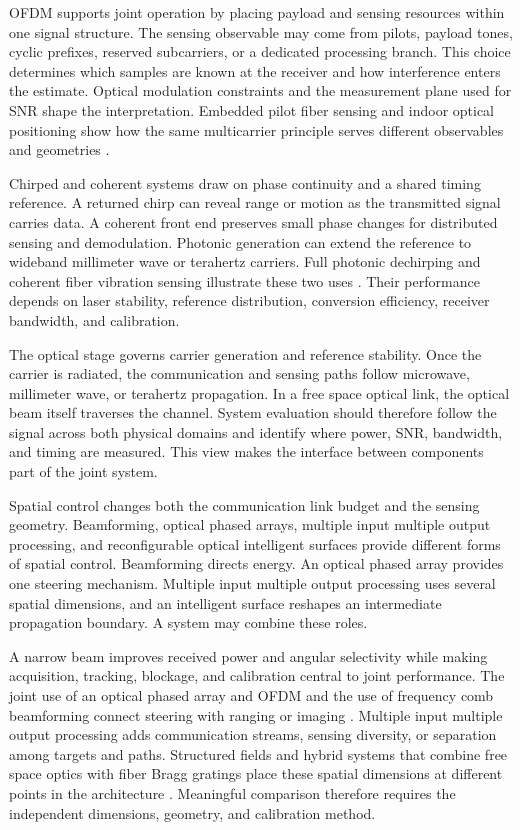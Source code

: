 OFDM supports joint operation by placing payload and sensing resources within
one signal structure. The sensing observable may come from pilots, payload
tones, cyclic prefixes, reserved subcarriers, or a dedicated processing branch.
This choice determines which samples are known at the receiver and how
interference enters the estimate. Optical modulation constraints and the
measurement plane used for SNR shape the interpretation. Embedded pilot fiber
sensing and indoor optical positioning show how the same multicarrier principle
serves different observables and geometries
\cite{OISAC_SCR00007,OISAC_SCR01024}.

Chirped and coherent systems draw on phase continuity and a shared timing
reference. A returned chirp can reveal range or motion as the transmitted signal
carries data. A coherent front end preserves small phase changes for distributed
sensing and demodulation. Photonic generation can extend the reference to
wideband millimeter wave or terahertz carriers. Full photonic dechirping and
coherent fiber vibration sensing illustrate these two uses
\cite{OISAC_SCR01000,OISAC_SCR00647}. Their performance depends on laser
stability, reference distribution, conversion efficiency, receiver bandwidth,
and calibration.

The optical stage governs carrier generation and reference stability. Once the
carrier is radiated, the communication and sensing paths follow microwave,
millimeter wave, or terahertz propagation. In a free space optical link, the
optical beam itself traverses the channel. System evaluation should therefore
follow the signal across both physical domains and identify where power, SNR,
bandwidth, and timing are measured. This view makes the interface between
components part of the joint system.

Spatial control changes both the communication link budget and the sensing
geometry. Beamforming, optical phased arrays, multiple input multiple output
processing, and reconfigurable optical intelligent surfaces provide different
forms of spatial control. Beamforming directs energy. An optical phased array
provides one steering mechanism. Multiple input multiple output processing uses
several spatial dimensions, and an intelligent surface reshapes an intermediate
propagation boundary. A system may combine these roles.

A narrow beam improves received power and angular selectivity while making
acquisition, tracking, blockage, and calibration central to joint performance.
The joint use of an optical phased array and OFDM and the use of frequency comb
beamforming connect steering with ranging or imaging
\cite{OISAC_SCR00941,OISAC_SCR00362}. Multiple input multiple output processing
adds communication streams, sensing diversity, or separation among targets and
paths. Structured fields and hybrid systems that combine free space
optics with fiber Bragg gratings place these spatial dimensions at different
points in the architecture \cite{OISAC_SCR00268,OISAC_SCR00277}. Meaningful
comparison therefore requires the independent dimensions, geometry, and
calibration method.

